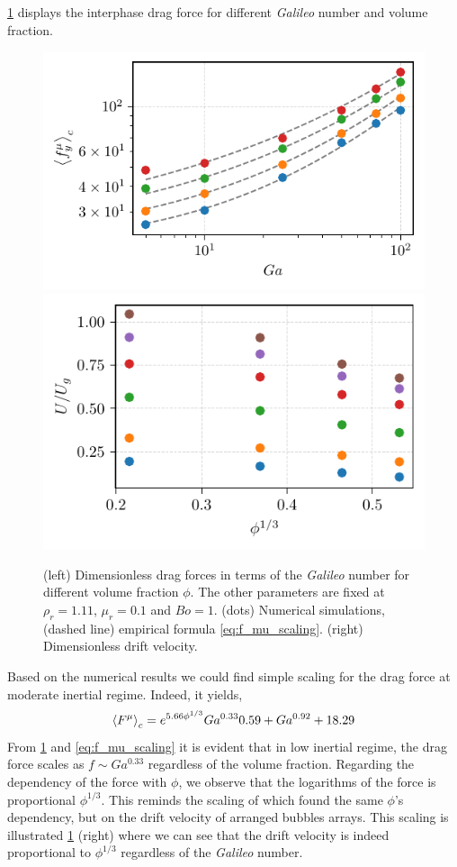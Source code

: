\ref{fig:f_mu} displays the interphase drag force for different \textit{Galileo} number and volume fraction. 
\begin{figure}[h!]
    \centering
    \includegraphics[height=0.3\textwidth]{image/HOMOGENEOUS/fCA/FH_mu_Ga.pdf}
    \includegraphics[height=0.3\textwidth]{image/HOMOGENEOUS/fCA/UstokesGa.pdf}
    \caption{(left) Dimensionless drag forces in terms of the \textit{Galileo} number for different volume fraction $\phi$. The other parameters are fixed at $\rho_r = 1.11$, $\mu_r = 0.1$ and $Bo = 1$.
    (dots) Numerical simulations, 
    (dashed line) empirical formula \ref{eq:f_mu_scaling}.
    (right) Dimensionless drift velocity.}
    \label{fig:f_mu}
\end{figure}
Based on the numerical results we could find simple scaling for the drag force at moderate inertial regime. 
Indeed, it yields,
\begin{equation}
    \left<F^\mu\right>_c = e^{5.66 \phi^{1/3}}  Ga^{0.33} 0.59 + Ga^{0.92} +18.29
    \label{eq:f_mu_scaling}
\end{equation}
From \ref{fig:f_mu} and \ref{eq:f_mu_scaling} it is evident  that in low inertial regime, the drag force scales as $f \sim Ga^{0.33}$ regardless of the volume fraction. 
Regarding the dependency of the force with $\phi$, we observe that the logarithms of the force is proportional $\phi^{1/3}$. 
This reminds the scaling of \cite{sangani1987sedimentation} which found the same $\phi$'s dependency, but on the drift velocity of arranged bubbles arrays.
This scaling is illustrated \ref{fig:f_mu} (right) where we can see that the drift velocity is indeed proportional to $\phi^{1/3}$ regardless of the \textit{Galileo} number.  